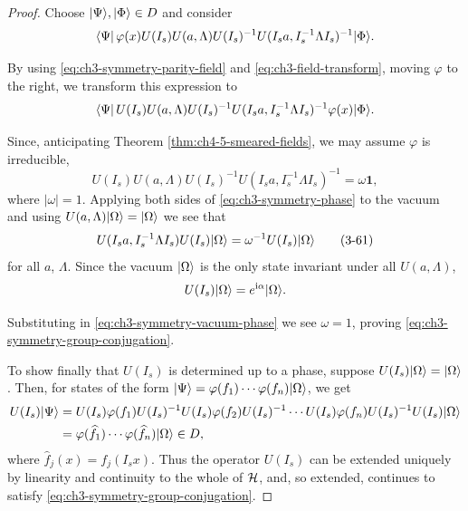 \begin{proof}
Choose $\lvert \Psi\rangle,\lvert \Phi\rangle\in D$ and consider
\begin{equation*}
\langle \Psi\rvert\,\varphi(x)U(I_s)U(a,\Lambda)U(I_s)^{-1}
U(I_sa,I_s^{-1}\Lambda I_s)^{-1}\lvert \Phi\rangle.
\end{equation*}

By using \eqref{eq:ch3-symmetry-parity-field} and \eqref{eq:ch3-field-transform}, moving $\varphi$ to the right, we transform this
expression to
\begin{equation*}
\langle \Psi\rvert\,U(I_s)U(a,\Lambda)U(I_s)^{-1}
U(I_sa,I_s^{-1}\Lambda I_s)^{-1}\varphi(x)\lvert \Phi\rangle.
\end{equation*}

Since, anticipating Theorem \ref{thm:ch4-5-smeared-fields}, we may assume $\varphi$ is irreducible,
\begin{equation}
  U(I_s)U(a,\Lambda)U(I_s)^{-1}U(I_sa,I_s^{-1}\Lambda I_s)^{-1}
  =\omega\mathbf{1},
  \tag{3-60}\label{eq:ch3-symmetry-phase}
\end{equation}
where $|\omega|=1$.  Applying both sides of \eqref{eq:ch3-symmetry-phase} to the vacuum and using
$U(a,\Lambda)\lvert \Omega\rangle=\lvert \Omega\rangle$ we see that
\begin{equation}
  U(I_sa,I_s^{-1}\Lambda I_s)U(I_s)\lvert \Omega\rangle
  =\omega^{-1}U(I_s)\lvert \Omega\rangle
  \tag{3-61}\label{eq:ch3-symmetry-vacuum-phase}
\end{equation}
for all $a$, $\Lambda$.  Since the vacuum $\lvert \Omega\rangle$ is the only state
invariant under all $U(a,\Lambda)$,
\begin{equation*}
  U(I_s)\lvert \Omega\rangle=e^{\mathrm{i}\alpha}\lvert \Omega\rangle.
\end{equation*}

Substituting in \eqref{eq:ch3-symmetry-vacuum-phase} we see $\omega=1$, proving \eqref{eq:ch3-symmetry-group-conjugation}.

To show finally that $U(I_s)$ is determined up to a phase, suppose
$U(I_s)\lvert \Omega\rangle=\lvert \Omega\rangle$.  Then, for states of the form
$\lvert \Psi\rangle=\varphi(f_1)\cdots\varphi(f_n)\lvert \Omega\rangle$, we get
\begin{equation*}
\begin{aligned}
  U(I_s)\lvert \Psi\rangle
  &={ }U(I_s)\varphi(f_1)U(I_s)^{-1}U(I_s)\varphi(f_2)U(I_s)^{-1}
  \cdots U(I_s)\varphi(f_n)U(I_s)^{-1}U(I_s)\lvert \Omega\rangle \\
  &={ }\varphi(\widehat f_1)\cdots\varphi(\widehat f_n)\lvert \Omega\rangle
  \in D,
\end{aligned}
\end{equation*}
where $\widehat f_j(x)=f_j(I_sx)$.  Thus the operator $U(I_s)$ can be
extended uniquely by linearity and continuity to the whole of $\mathcal{H}$, and,
so extended, continues to satisfy \eqref{eq:ch3-symmetry-group-conjugation}.
\end{proof}

